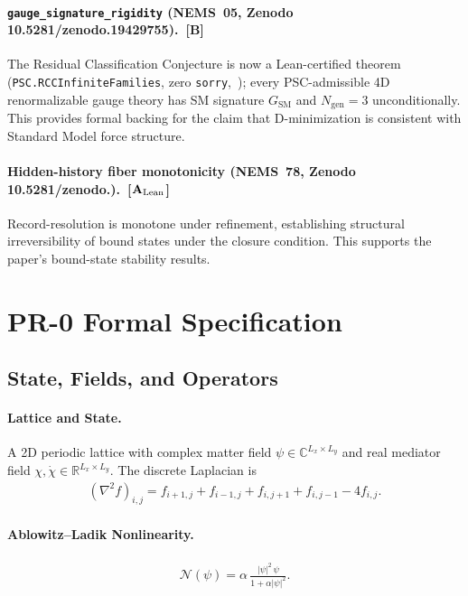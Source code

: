 \documentclass[12pt]{article}
\newcommand{\CatAL}{\ensuremath{\textbf{A}_{\rm Lean}}}
\newcommand{\CatB}{\textbf{B}}
\begin{document}
\begin{sloppypar}
\paragraph{\texttt{gauge\_signature\_rigidity} (NEMS~05,
Zenodo 10.5281/\allowbreak zenodo.19429755).~[$\CatB$]}
The Residual Classification Conjecture is now a Lean-certified theorem (\texttt{PSC.\allowbreak RCCInfiniteFamilies}, zero \texttt{sorry},~\cite{ugp-lean}); every PSC-admissible
4D renormalizable gauge theory has SM signature $G_{\mathrm{SM}}$ and
$N_{\mathrm{gen}}=3$ unconditionally.
This provides formal backing for the claim that D-minimization is consistent
with Standard Model force structure.
\end{sloppypar}

\begin{sloppypar}
\paragraph{Hidden-history fiber monotonicity (NEMS~78,
Zenodo 10.5281/\allowbreak zenodo.).~[$\CatAL$]}
Record-resolution is monotone under refinement, establishing structural
irreversibility of bound states under the closure condition.
This supports the paper's bound-state stability results.
\end{sloppypar}




\appendix
\section{PR-0 Formal Specification}\label{app:pr0}
\subsection{State, Fields, and Operators}
\paragraph{Lattice and State.} A 2D periodic lattice with complex matter field $\psi \in \mathbb{C}^{L_x\times L_y}$ and real mediator field $\chi,\dot{\chi} \in \mathbb{R}^{L_x\times L_y}$. The discrete Laplacian is
\begin{align}
(\nabla^2 f)_{i,j} = f_{i+1,j}+f_{i-1,j}+f_{i,j+1}+f_{i,j-1}-4f_{i,j}.
\end{align}
\paragraph{Ablowitz--Ladik Nonlinearity.}
\begin{align}
\mathcal{N}(\psi) = \alpha\,\frac{|\psi|^2\,\psi}{1+\alpha|\psi|^2}.
\end{align}
\end{document}
